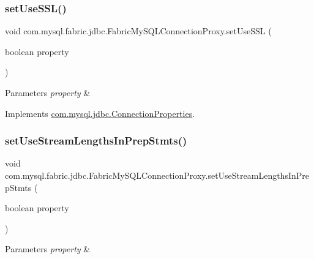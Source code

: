 \subsubsection{\texorpdfstring{set\+Use\+S\+S\+L()}{setUseSSL()}}
{\footnotesize\ttfamily void com.\+mysql.\+fabric.\+jdbc.\+Fabric\+My\+S\+Q\+L\+Connection\+Proxy.\+set\+Use\+S\+SL (\begin{DoxyParamCaption}\item[{boolean}]{property }\end{DoxyParamCaption})}


\begin{DoxyParams}{Parameters}
{\em property} & \\
\hline
\end{DoxyParams}


Implements \mbox{\hyperlink{interfacecom_1_1mysql_1_1jdbc_1_1_connection_properties_a34adc2d834bd1ce90f8c8e65498906bd}{com.\+mysql.\+jdbc.\+Connection\+Properties}}.

\mbox{\label{classcom_1_1mysql_1_1fabric_1_1jdbc_1_1_fabric_my_s_q_l_connection_proxy_a1260df118727a00af1189f53624b3e30}} 
\subsubsection{\texorpdfstring{set\+Use\+Stream\+Lengths\+In\+Prep\+Stmts()}{setUseStreamLengthsInPrepStmts()}}
{\footnotesize\ttfamily void com.\+mysql.\+fabric.\+jdbc.\+Fabric\+My\+S\+Q\+L\+Connection\+Proxy.\+set\+Use\+Stream\+Lengths\+In\+Prep\+Stmts (\begin{DoxyParamCaption}\item[{boolean}]{property }\end{DoxyParamCaption})}


\begin{DoxyParams}{Parameters}
{\em property} & \\
\hline
\end{DoxyParams}


